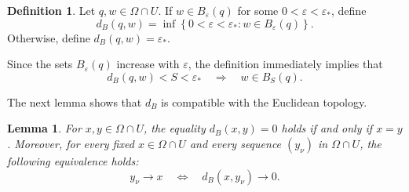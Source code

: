 \documentclass[11pt]{article}
\newtheorem{lemma}[theorem]{Lemma}
\theoremstyle{definition}
\newtheorem{definition}[theorem]{Definition}
\newcommand{\eps}{\varepsilon}
\begin{document}
\begin{definition}\label{def:dB}
	Let \(q,w\in\Omega\cap U\).  If \(w\in B_\eps(q)\) for some
	\(0<\eps<\eps_*\), define
	\begin{equation*}
		d_B(q,w)
		=
		\inf\left\{
		0<\eps<\eps_*:
		w\in B_\eps(q)
		\right\}.
	\end{equation*}
	Otherwise, define
	\(d_B(q,w)=\eps_*\).
\end{definition}

Since the sets \(B_\eps(q)\) increase with \(\eps\), the definition immediately
implies that
\begin{equation*}
 d_B(q,w)<S<\eps_*
 \quad\Longrightarrow\quad
 w\in B_S(q).
\end{equation*}

The next lemma shows that \(d_B\) is compatible
with the Euclidean topology.


\begin{lemma}\label{lem:dB-separation}
    For \(x,y\in\Omega\cap U\), the equality \(d_B(x,y)=0\) holds
    if and only if \(x=y\).
    Moreover, for every fixed \(x\in\Omega\cap U\) and every sequence
    \((y_\nu)\) in \(\Omega\cap U\), the following equivalence holds:
    \[
    y_\nu\longrightarrow x
    \quad\Longleftrightarrow\quad
    d_B(x,y_\nu)\longrightarrow0.
    \]
\end{lemma}
\end{document}
